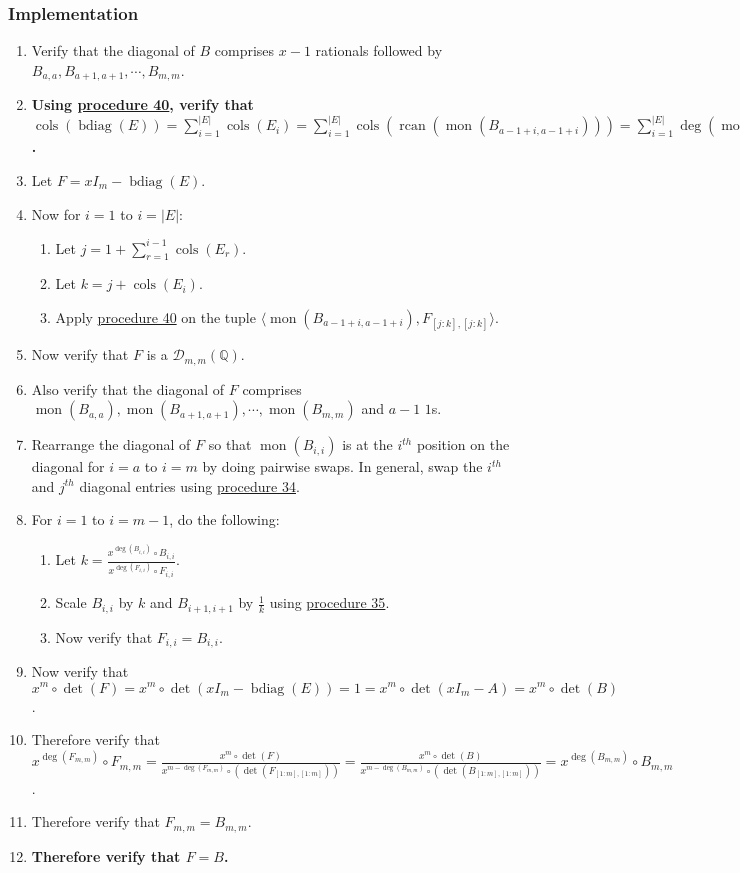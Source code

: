 \documentclass[twocolumn]{article}
\DeclareMathOperator{\bdiag}{bdiag}
\DeclareMathOperator{\rcan}{rcan}
\DeclareMathOperator{\mon}{mon}
\DeclareMathOperator{\cols}{cols}
\begin{document}
			\subsubsection{Implementation}
				\begin{enumerate}
					\item Verify that the diagonal of $B$ comprises $x-1$ rationals followed by $B_{a,a},B_{a+1,a+1},\cdots,B_{m,m}$.
					\item \textbf{Using \hyperref[sec:procedure 40]{procedure 40}, verify that $\cols(\bdiag(E))=\sum_{i=1}^{\lvert E\rvert}\cols(E_i)=\sum_{i=1}^{\lvert E\rvert}\cols(\rcan(\mon(B_{a-1+i,a-1+i})))=\sum_{i=1}^{\lvert E\rvert}\deg(\mon(B_{a-1+i,a-1+i}))=\sum_{i=1}^{m+1-a}\deg(B_{a-1+i,a-1+i})=\sum_{i=a}^m\deg(B_{i,i})=m$.}
					\item Let $F=xI_m-\bdiag(E)$.
					\item Now for $i=1$ to $i=\lvert E\rvert$:
					\begin{enumerate}
						\item Let $j=1+\sum_{r=1}^{i-1}\cols(E_r)$.
						\item Let $k=j+\cols(E_i)$.
						\item Apply \hyperref[sec:procedure 40]{procedure 40} on the tuple $\langle\mon(B_{a-1+i,a-1+i}),F_{[j:k],[j:k]}\rangle$.
					\end{enumerate}
					\item Now verify that $F$ is a $\mathcal{D}_{m,m}(\mathbb{Q})$.
					\item Also verify that the diagonal of $F$ comprises $\mon(B_{a,a}),\mon(B_{a+1,a+1}),\cdots,\mon(B_{m,m})$ and $a-1$ $1$s.
					\item Rearrange the diagonal of $F$ so that $\mon(B_{i,i})$ is at the $i^{th}$ position on the diagonal for $i=a$ to $i=m$ by doing pairwise swaps. In general, swap the $i^{th}$ and $j^{th}$ diagonal entries using \hyperref[sec:procedure 34]{procedure 34}.
					\item For $i=1$ to $i=m-1$, do the following:
					\begin{enumerate}
						\item Let $k=\frac{x^{\deg(B_{i,i})}\circ B_{i,i}}{x^{\deg(F_{i,i})}\circ F_{i,i}}$.
						\item Scale $B_{i,i}$ by $k$ and $B_{i+1,i+1}$ by $\frac{1}{k}$ using \hyperref[sec:procedure 35]{procedure 35}.
						\item Now verify that $F_{i,i}=B_{i,i}$.
					\end{enumerate}
					\item Now verify that $x^m\circ\det(F)=x^m\circ\det(xI_m-\bdiag(E))=1=x^m\circ\det(xI_m-A)=x^m\circ\det(B)$.
					\item Therefore verify that $x^{\deg(F_{m,m})}\circ F_{m,m}=\frac{x^m\circ\det(F)}{x^{m-\deg(F_{m,m})}\circ(\det(F_{[1:m],[1:m]}))}=\frac{x^m\circ\det(B)}{x^{m-\deg(B_{m,m})}\circ(\det(B_{[1:m],[1:m]}))}=x^{\deg(B_{m,m})}\circ B_{m,m}$.
					\item Therefore verify that $F_{m,m}=B_{m,m}$.
					\item \textbf{Therefore verify that $F=B$.}
				\end{enumerate}
\end{document}
